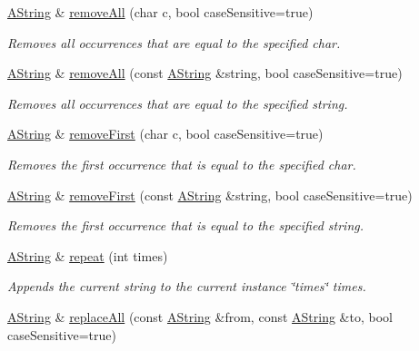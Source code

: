 \begin{DoxyCompactItemize}
\mbox{\hyperlink{class_a_string}{A\+String}} \& \mbox{\hyperlink{class_a_string_aa5449e9044b69fa7987139d32981b374}{remove\+All}} (char c, bool case\+Sensitive=true)
\begin{DoxyCompactList}\small\item\em Removes all occurrences that are equal to the specified char. \end{DoxyCompactList}\item 
\mbox{\hyperlink{class_a_string}{A\+String}} \& \mbox{\hyperlink{class_a_string_a4b4c9d14b53ed0dce8314d7d14755d8b}{remove\+All}} (const \mbox{\hyperlink{class_a_string}{A\+String}} \&string, bool case\+Sensitive=true)
\begin{DoxyCompactList}\small\item\em Removes all occurrences that are equal to the specified string. \end{DoxyCompactList}\item 
\mbox{\hyperlink{class_a_string}{A\+String}} \& \mbox{\hyperlink{class_a_string_a5fe11f844aa85e053fbf0bedc18cd557}{remove\+First}} (char c, bool case\+Sensitive=true)
\begin{DoxyCompactList}\small\item\em Removes the first occurrence that is equal to the specified char. \end{DoxyCompactList}\item 
\mbox{\hyperlink{class_a_string}{A\+String}} \& \mbox{\hyperlink{class_a_string_af7ef7985f65cfab4b67b5772717f7496}{remove\+First}} (const \mbox{\hyperlink{class_a_string}{A\+String}} \&string, bool case\+Sensitive=true)
\begin{DoxyCompactList}\small\item\em Removes the first occurrence that is equal to the specified string. \end{DoxyCompactList}\item 
\mbox{\hyperlink{class_a_string}{A\+String}} \& \mbox{\hyperlink{class_a_string_a04bdc2e3cdfe637d2e5754227677eea1}{repeat}} (int times)
\begin{DoxyCompactList}\small\item\em Appends the current string to the current instance \char`\"{}times\char`\"{} times. \end{DoxyCompactList}\item 
\mbox{\hyperlink{class_a_string}{A\+String}} \& \mbox{\hyperlink{class_a_string_a53703f2b13b21435e7cdadc4fd1a7015}{replace\+All}} (const \mbox{\hyperlink{class_a_string}{A\+String}} \&from, const \mbox{\hyperlink{class_a_string}{A\+String}} \&to, bool case\+Sensitive=true)

\end{DoxyCompactItemize}

